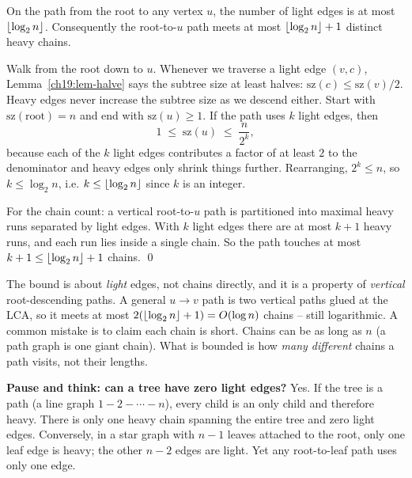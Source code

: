 \begin{theorem}
\label{ch19:thm-loglight}
On the path from the root to any vertex $u$, the number of light edges is at most
$\lfloor\log_2 n\rfloor$. Consequently the root-to-$u$ path meets at most $\lfloor\log_2 n\rfloor+1$ distinct
heavy chains.
\end{theorem}

\begin{whybox}
Walk from the root down to $u$. Whenever we traverse a light edge $(v,c)$, Lemma~\ref{ch19:lem-halve}
says the subtree size at least halves: $\mathrm{sz}(c)\le\mathrm{sz}(v)/2$. Heavy edges never increase
the subtree size as we descend either. Start with $\mathrm{sz}(\text{root})=n$ and end with
$\mathrm{sz}(u)\ge 1$. If the path uses $k$ light edges, then
\[
  1 \;\le\; \mathrm{sz}(u) \;\le\; \frac{n}{2^{k}},
\]
because each of the $k$ light edges contributes a factor of at least $2$ to the denominator and heavy
edges only shrink things further. Rearranging, $2^k\le n$, so $k\le\log_2 n$, i.e.
$k\le\lfloor\log_2 n\rfloor$ since $k$ is an integer.

For the chain count: a vertical root-to-$u$ path is partitioned into maximal heavy runs separated by
light edges. With $k$ light edges there are at most $k+1$ heavy runs, and each run lies inside a single
chain. So the path touches at most $k+1\le\lfloor\log_2 n\rfloor+1$ chains. \qed
\end{whybox}

\begin{trapbox}
The bound is about \emph{light} edges, not chains directly, and it is a property of \emph{vertical}
root-descending paths. A general $u\!\to\!v$ path is two vertical paths glued at the LCA, so it meets
at most $2(\lfloor\log_2 n\rfloor+1)=O(\log n)$ chains -- still logarithmic. A common mistake is to claim
each chain is short. Chains can be as long as $n$ (a path graph is one giant chain). What is bounded is
how \emph{many different} chains a path visits, not their lengths.
\end{trapbox}

\begin{recoverybox}
\textbf{Pause and think: can a tree have zero light edges?}
Yes. If the tree is a path (a line graph $1-2-\cdots-n$), every child is an only child and therefore heavy. There is only one heavy chain spanning the entire tree and zero light edges. Conversely, in a star graph with $n-1$ leaves attached to the root, only one leaf edge is heavy; the other $n-2$ edges are light. Yet any root-to-leaf path uses only one edge.
\end{recoverybox}

